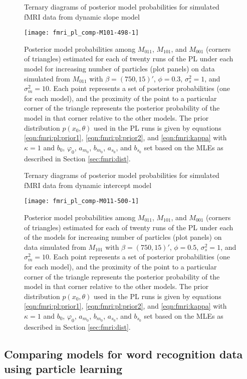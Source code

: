 \begin{figure}
\ssp
\centering
\caption{Ternary diagrams of posterior model probabilities for simulated fMRI data from dynamic slope model} \label{fig:fmri:comp:M011}
\texttt{[image: fmri\_pl\_comp-M101-498-1]}
\caption*{Posterior model probabilities among $M_{011}$, $M_{101}$, and $M_{001}$ (corners of triangles) estimated for each of twenty runs of the PL under each model for increasing number of particles (plot panels) on data simulated from $M_{011}$ with $\beta = (750,15)'$, $\phi = 0.3$, $\sigma^2_s = 1$, and $\sigma^2_m = 10$. Each point represents a set of posterior probabilities (one for each model), and the proximity of the point to a particular corner of the triangle represents the posterior probability of the model in that corner relative to the other models. The prior distribution $p(x_0,\theta)$ used in the PL runs is given by equations \eqref{eqn:fmri:pl:prior1}, \eqref{eqn:fmri:pl:prior2}, and \eqref{eqn:fmri:kappa} with $\kappa = 1$ and $b_0$, $\varphi_0$, $a_{m_0}$, $b_{m_0}$, $a_{s_0}$, and $b_{s_0}$ set based on the MLEs as described in Section \ref{sec:fmri:dist}.}
\end{figure}

\begin{figure}
\ssp
\centering
\caption{Ternary diagrams of posterior model probabilities for simulated fMRI data from dynamic intercept model} \label{fig:fmri:comp:M101}
\texttt{[image: fmri\_pl\_comp-M011-500-1]}
\caption*{Posterior model probabilities among $M_{011}$, $M_{101}$, and $M_{001}$ (corners of triangles) estimated for each of twenty runs of the PL under each of the models for increasing number of particles (plot panels) on data simulated from $M_{101}$ with $\beta = (750,15)'$, $\phi = 0.5$, $\sigma^2_s = 1$, and $\sigma^2_m = 10$. Each point represents a set of posterior probabilities (one for each model), and the proximity of the point to a particular corner of the triangle represents the posterior probability of the model in that corner relative to the other models. The prior distribution $p(x_0,\theta)$ used in the PL runs is given by equations \eqref{eqn:fmri:pl:prior1}, \eqref{eqn:fmri:pl:prior2}, and \eqref{eqn:fmri:kappa} with $\kappa = 1$ and $b_0$, $\varphi_0$, $a_{m_0}$, $b_{m_0}$, $a_{s_0}$, and $b_{s_0}$ set based on the MLEs as described in Section \ref{sec:fmri:dist}.}
\end{figure}

\subsection{Comparing models for word recognition data using particle learning \label{sec:fmri:real}}

